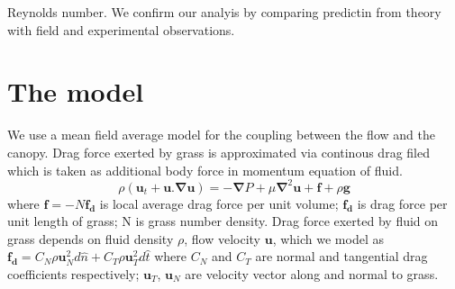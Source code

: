 \documentclass[aps,preprint,floatfix,prl]{revtex4-1}
\newcommand{\bu}{\mathbf{u}}
\newcommand{\grad}{\mathbf{\nabla}}
\begin{document}
Reynolds number. We confirm our analyis by comparing predictin from theory with field and experimental observations.  

\section{The model}
We use a mean field average model for the coupling between the flow and the canopy. Drag force exerted by grass is approximated via continous drag filed which is taken as additional body force 
in momentum equation of fluid. 
\begin{equation}
\rho \left(\bu_{t}+\bu.\grad\bu \right) = -\grad P+\mu\grad^{2}\bu +\mathbf{f}+\rho\mathbf{g}
\end{equation}
where $\mathbf{f}=-N\mathbf{f_d}$ is local average drag force per unit volume; $\mathbf{f_{d}}$ is drag force per unit length of grass; N is grass number density. 
Drag force exerted by fluid on grass depends on fluid density $\rho$, flow velocity $\bu$, which we model as $\mathbf{f_{d}}=C_N \rho\bu_{N}^{2}d\hat{n}+C_{T}\rho\bu_{T}^{2}d\hat{t}$ where 
$C_{N}$ and $C_{T}$ are normal and tangential drag coefficients respectively; $\bu_{T}$, $\bu_{N}$ are velocity vector along and normal to grass.
\end{document}
